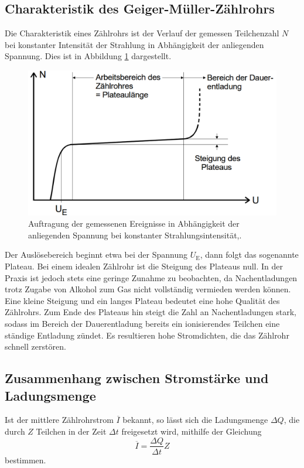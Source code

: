 \subsection{Charakteristik des Geiger-Müller-Zählrohrs}
\label{subsec:theorie3}

Die Charakteristik eines Zählrohrs ist der Verlauf der gemessen Teilchenzahl $N$ bei konstanter Intensität
der Strahlung in Abhängigkeit der anliegenden Spannung. Dies ist in Abbildung \ref{fig:charakteristik}
dargestellt.

\begin{figure}
  \centering
  \includegraphics[width=\textwidth]{data/charakteristik.png}
  \caption{Auftragung der gemessenen Ereignisse in Abhängigkeit der anliegenden Spannung bei konstanter Strahlungsintensität,\cite{Versuchsanleitung}.}
  \label{fig:charakteristik}
\end{figure}

Der Auslösebereich beginnt etwa bei der Spannung $U_\text{E}$, dann folgt das sogenannte
Plateau. Bei einem idealen Zählrohr ist die Steigung des Plateaus null. In der Praxis
ist jedoch stets eine geringe Zunahme zu beobachten, da Nachentladungen trotz Zugabe
von Alkohol zum Gas nicht vollständig vermieden werden können. Eine kleine Steigung und ein
langes Plateau bedeutet eine hohe Qualität des Zählrohrs. Zum Ende des Plateaus hin
steigt die Zahl an Nachentladungen stark, sodass im Bereich der Dauerentladung bereits
ein ionisierendes Teilchen eine ständige Entladung zündet. Es resultieren hohe Stromdichten, die
das Zählrohr schnell zerstören.

\subsection{Zusammenhang zwischen Stromstärke und Ladungsmenge}
\label{subsec:theorie4}

Ist der mittlere Zählrohrstrom $\overline{I}$ bekannt, so lässt sich die Ladungsmenge
$\Delta Q$, die durch $Z$ Teilchen in der Zeit $\Delta t$ freigesetzt wird, mithilfe der Gleichung
\begin{equation}
  \overline{I} = \frac{\Delta Q}{\Delta t} Z
  \label{eqn:ladung}
\end{equation}
bestimmen.
